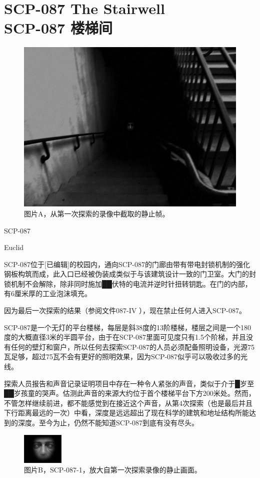 \chapter[SCP-087 楼梯间]{
    SCP-087 The Stairwell\\
    SCP-087 楼梯间\\
    \heritage
}

\label{chap:SCP-087}

\begin{figure}[H]
    \centering
    \includegraphics[width=0.5\linewidth]{images/SCP-087.png}
    \caption*{图片A，从第一次探索的录像中截取的静止帧。}
\end{figure}

SCP-087

Euclid

SCP-087位于{[}已编辑]的校园内，通向SCP-087的门廊由带有带电封锁机制的强化钢板构筑而成，此入口已经被伪装成类似于与该建筑设计一致的门卫室。大门的封锁机制不会解除，除非同时施加██伏特的电流并逆时针扭转钥匙。在门的内部，有6厘米厚的工业泡沫填充。

因为最后一次探索的结果（参阅文件087-IV ），现在禁止任何人进入SCP-087。

 SCP-087是一个无灯的平台楼梯，每层是斜38度的13阶楼梯，楼层之间是一个180度的大概直径3米的半圆平台，由于在SCP-087里面可见度只有1.5个阶梯，并且没有任何的壁灯和窗户，所以任何去探索SCP-087的人员必须配备照明设备，光源75瓦足够，超过75瓦不会有更好的照明效果，因为SCP-087似乎可以吸收过多的光线。

探索人员报告和声音记录证明项目中存在一种令人紧张的声音，类似于介于█岁至██岁孩童的哭声。估测此声音的来源大约位于首个楼梯平台下方200米处。然而，不管怎样继续前进，都不能感觉到在接近这个声音，从第4次探索（也是最后并且下行距离最远的一次）中看，深度是远远超出了现在科学的建筑和地址结构所能达到的深度。至今为止，仍然不能知道SCP-087到底有没有尽头。

\begin{figure}[H]
    \centering
    \includegraphics[width=0.5\linewidth]{images/SCP-087-2.png}
    \caption*{图片B，SCP-087-1，放大自第一次探索录像的静止画面。}
\end{figure}

